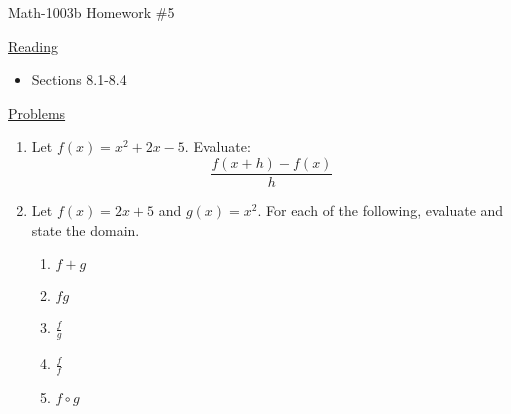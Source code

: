 \documentclass[letterpaper,12pt,fleqn]{article}
\begin{document}
\begin{center}
\Large Math-1003b Homework \#5
\end{center}

\vspace{0.5in}

\underline{Reading}

\bigskip

\begin{itemize}
\item Sections 8.1-8.4
\end{itemize}

\bigskip

\underline{Problems}

\bigskip

\begin{enumerate}
\item Let $f(x)=x^2+2x-5$. Evaluate:
  \[\frac{f(x+h)-f(x)}{h}\]

\item Let $f(x)=2x+5$ and $g(x)=x^2$. For each of the following,
  evaluate and state the domain.
  \begin{enumerate}
  \item $f+g$
  \item $fg$
  \item $\frac{f}{g}$
  \item $\frac{f}{f}$
  \item $f\circ g$
  \end{enumerate}
\end{enumerate}
\end{document}
